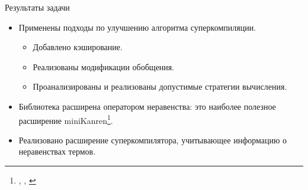 \documentclass[xcolor=table]{beamer}
\newcommand{\citepres}[1]{{\it \citetitle{#1}}, \citeauthor{#1}, \citeyear{#1}}
\begin{document}
\begin{frame}{Результаты задачи}
\begin{itemize}
\item Применены подходы по улучшению алгоритма суперкомпиляции.
\begin{itemize}
\item Добавлено кэширование.
\item Реализованы модификации обобщения.
\item Проанализированы и реализованы допустимые стратегии вычисления.
\end{itemize}
\item Библиотека расширена оператором неравенства:
      это наиболее полезное расширение miniKanren\footnote{\citepres{diseqSem}}.
\item Реализовано расширение суперкомпилятора, учитывающее информацию о неравенствах термов.
\end{itemize}
\end{frame}
\end{document}

